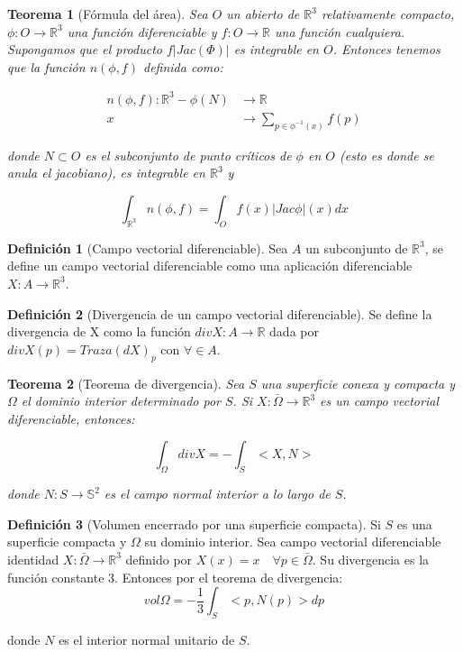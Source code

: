 \documentclass[paper=a4, fontsize=11pt, spanish]{scrartcl}
\newcommand{\rtres}{\mathbb{R}^3}
\newtheorem{theorem}{Teorema}[section]
\theoremstyle{definition}
\theoremstyle{definition}
\newtheorem{definition}{Definición}
\theoremstyle{definition}
\begin{document}
\begin{theorem}[Fórmula del área]
Sea $O$ un abierto de $\rtres$ relativamente compacto, $\phi: O \longrightarrow \rtres$ una función diferenciable y $f: O \longrightarrow \mathbb{R}$ una función cualquiera. Supongamos que el producto $f|Jac(\Phi)|$ es integrable en $O$. Entonces tenemos que la función $n(\phi, f)$ definida como:

\begin{align*}
    n(\phi, f): \rtres - \phi(N) &\longrightarrow \mathbb{R} \\
    x &\longrightarrow \sum_{p \in \phi^{-1}(x)} f(p)
\end{align*}

donde $N \subset O$ es el subconjunto de punto críticos de $\phi$ en $O$ (esto es donde se anula el jacobiano), es integrable en $\rtres$ y

\begin{equation*}
    \int_{\rtres} n(\phi, f) = \int_O f(x)|Jac \phi|(x)dx
\end{equation*}

\end{theorem}


\begin{definition}[Campo vectorial diferenciable]
Sea $A$ un subconjunto de $\rtres$, se define un campo vectorial diferenciable como una aplicación diferenciable $X: A \longrightarrow \rtres$.
\end{definition}


\begin{definition}[Divergencia de un campo vectorial diferenciable]
Se define la divergencia de X como la función $div X: A \longrightarrow \mathbb{R}$ dada por $divX(p) = Traza(dX)_p$ con $\forall \in A$.
\end{definition}


\begin{theorem}[Teorema de divergencia]
Sea $S$ una superficie conexa y compacta y $\Omega$ el dominio interior determinado por $S$. Si $X: \bar{\Omega} \longrightarrow \rtres$ es un campo vectorial diferenciable, entonces:

\begin{equation*}
    \int_\Omega div X = -\int_S <X,N>
\end{equation*}

donde $N: S \longrightarrow \mathbb{S}^2$ es el campo normal interior a lo largo de $S$.
\end{theorem}

\begin{definition}[Volumen encerrado por una superficie compacta]
Si $S$ es una superficie compacta y $\Omega$ su dominio interior. Sea campo vectorial diferenciable identidad $X: \bar{\Omega} \longrightarrow \rtres$ definido por $X(x) = x \quad \forall p \in \bar{\Omega}$. Su divergencia es la función constante 3. Entonces por el teorema de divergencia:
\begin{equation*}
    vol \Omega = - \frac{1}{3} \int_S <p, N(p)> dp
\end{equation*}

donde $N$ es el interior normal unitario de $S$.
\end{definition}
\end{document}
